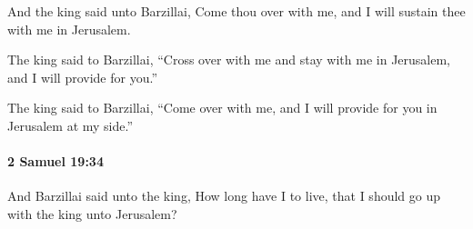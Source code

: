 			\begin{versebox}
					\item[BHS] 
					\item[ASV] And the king said unto Barzillai, Come thou over with me, and I will sustain thee with me in Jerusalem.
					\item[NIV] The king said to Barzillai, “Cross over with me and stay with me in Jerusalem, and I will provide for you.”
					\item[NRSV] The king said to Barzillai, “Come over with me, and I will provide for you in Jerusalem at my side.”
			\end{versebox}

		\paragraph{2 Samuel 19:34} %
			\label{2SAMUEL-19-34}

			And Barzillai said unto the king, How long have I to live, that I should go up with the king unto Jerusalem?

